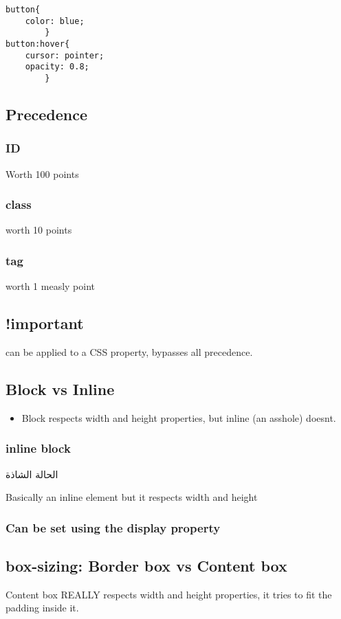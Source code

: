 \documentclass[11pt]{article}
\begin{document}
\begin{verbatim}
button{
    color: blue;
        }
button:hover{
    cursor: pointer;
    opacity: 0.8;
        }
\end{verbatim}
\subsection{Precedence}
\label{sec:org6c1350b}
\subsubsection{ID}
\label{sec:orgf5f1b76}
Worth 100 points
\subsubsection{class}
\label{sec:org751c802}
worth 10 points
\subsubsection{tag}
\label{sec:org900ea2a}
worth 1 measly point
\subsection{!important}
\label{sec:org0e64b98}
can be applied to a CSS property, bypasses all precedence.
\subsection{Block vs Inline}
\label{sec:org51e3c97}
\begin{itemize}
\item Block respects width and height properties, but inline (an asshole) doesnt.
\end{itemize}
\subsubsection{inline block}
\label{sec:org995630b}
الحالة الشاذة

Basically an inline element but it respects width and height
\subsubsection{Can be set using the display property}
\label{sec:orgd7d0176}
\subsection{box-sizing: Border box vs Content box}
\label{sec:orga45b948}
Content box REALLY respects width and height properties, it tries to fit the padding inside it.
\end{document}
